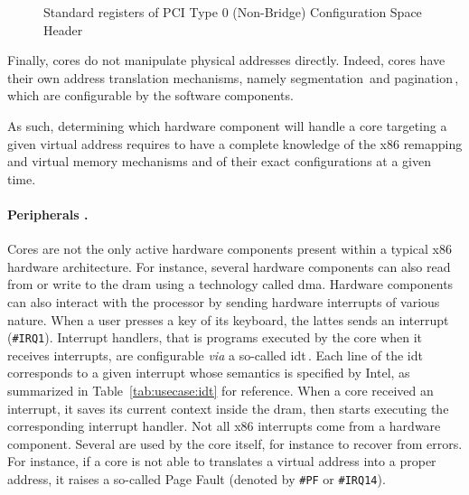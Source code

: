 \begin{figure}
  \begin{center}
    \def\svgwidth{0.8\textwidth} \resizebox{0.6\textwidth}{!}{%
      }
  \end{center}
  \caption{Standard registers of PCI Type 0 (Non-Bridge) Configuration Space
    Header}
  \label{fig:usecase:pciconfig}
\end{figure}

Finally, cores do not manipulate physical addresses directly.
%
Indeed, cores have their own address translation mechanisms, namely
segmentation\,\cite[Volume 3, Section 2.4]{intel2014manual} and
pagination\,\cite[Volume 3, Chapter 4]{intel2014manual}, which are configurable
by the software components.

As such, determining which hardware component will handle a core \IO targeting a
given virtual address requires to have a complete knowledge of the x86 remapping
and virtual memory mechanisms and of their exact configurations at a given time.

\paragraph{Peripherals \IOs.}
%
Cores are not the only active hardware components present within a typical x86
hardware architecture.
%
For instance, several hardware components can also read from or write to the
\ac{dram} using a technology called \ac{dma}.
%
Hardware components can also interact with the processor by sending hardware
interrupts of various nature.
%
When a user presses a key of its keyboard, the lattes sends an interrupt
(\texttt{\#IRQ1}).
%
Interrupt handlers, that is programs executed by the core when it receives
interrupts, are configurable \emph{via} a so-called \ac{idt}\,\cite[Volume 3,
Chapter 6]{intel2014manual}.
%
Each line of the \ac{idt} corresponds to a given interrupt whose semantics is
specified by Intel, as summarized in Table~\ref{tab:usecase:idt} for reference.
%
When a core received an interrupt, it saves its current context inside the
\ac{dram}, then starts executing the corresponding interrupt handler.
%
Not all x86 interrupts come from a hardware component.
%
Several are used by the core itself, for instance to recover from errors.
%
For instance, if a core is not able to translates a virtual address into a
proper address, it raises a so-called Page Fault (denoted by \texttt{\#PF} or
\texttt{\#IRQ14}).

